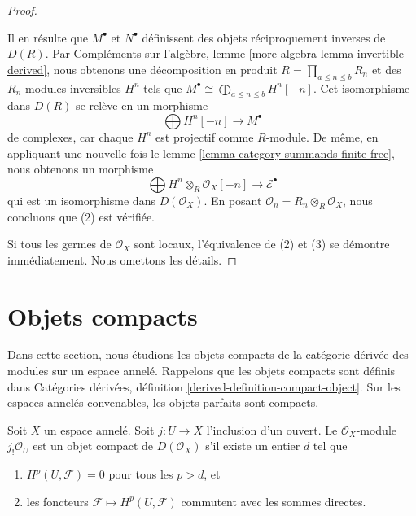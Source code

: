 \begin{proof}
\begin{enumerate}
\end{enumerate}

Il en résulte que $M^\bullet$ et $N^\bullet$ définissent des objets réciproquement inverses de $D(R)$. Par Compléments sur l'algèbre, lemme \ref{more-algebra-lemma-invertible-derived},
nous obtenons une décomposition en produit $R = \prod_{a \leq n \leq b} R_n$
et des $R_n$-modules inversibles $H^n$ tels que $M^\bullet \cong \bigoplus_{a \leq n \leq b} H^n[-n]$. Cet isomorphisme dans $D(R)$ se relève en un morphisme
$$
\bigoplus H^n[-n] \longrightarrow M^\bullet
$$
de complexes, car chaque $H^n$ est projectif comme $R$-module. De même, en appliquant une nouvelle fois le lemme \ref{lemma-category-summands-finite-free}, nous obtenons un morphisme
$$
\bigoplus H^n \otimes_R \mathcal{O}_X[-n] \to \mathcal{E}^\bullet
$$
qui est un isomorphisme dans $D(\mathcal{O}_X)$. En posant
$\mathcal{O}_n = R_n \otimes_R \mathcal{O}_X$, nous concluons que (2) est vérifiée.

\medskip\noindent

Si tous les germes de $\mathcal{O}_X$ sont locaux, l'équivalence de (2) et (3) se démontre immédiatement. Nous omettons les détails.

\end{proof}





\section{Objets compacts}

\label{section-compact}

\noindent
Dans cette section, nous étudions les objets compacts de la catégorie dérivée des modules sur un espace annelé. Rappelons que les objets compacts sont définis dans Catégories dérivées, définition \ref{derived-definition-compact-object}. Sur les espaces annelés convenables, les objets parfaits sont compacts.

\begin{lemma}

\label{lemma-when-jshriek-compact}
Soit $X$ un espace annelé. Soit $j : U \to X$ l'inclusion d'un ouvert. Le $\mathcal{O}_X$-module $j_!\mathcal{O}_U$ est un objet compact de $D(\mathcal{O}_X)$ s'il existe un entier $d$ tel que
\begin{enumerate}
\item $H^p(U, \mathcal{F}) = 0$ pour tous les $p > d$, et
\item les foncteurs $\mathcal{F} \mapsto H^p(U, \mathcal{F})$
commutent avec les sommes directes.
\end{enumerate}

\end{lemma}

